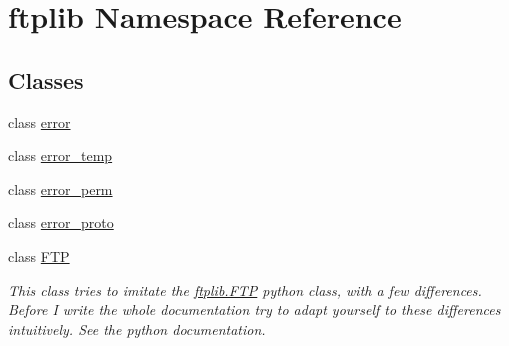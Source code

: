 \hypertarget{namespaceftplib}{
\section{ftplib Namespace Reference}
\label{namespaceftplib}
}
\subsection*{Classes}
\begin{CompactItemize}
\item 
class \hyperlink{classftplib_1_1error}{error}
\item 
class \hyperlink{classftplib_1_1error__temp}{error\_\-temp}
\item 
class \hyperlink{classftplib_1_1error__perm}{error\_\-perm}
\item 
class \hyperlink{classftplib_1_1error__proto}{error\_\-proto}
\item 
class \hyperlink{classftplib_1_1FTP}{FTP}
\begin{CompactList}\small\item\em This class tries to imitate the \hyperlink{classftplib_1_1FTP}{ftplib.FTP} python class, with a few differences. Before I write the whole documentation try to adapt yourself to these differences intuitively. See the python documentation. \item\end{CompactList}\end{CompactItemize}
